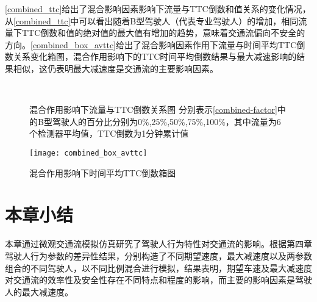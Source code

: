 \autoref{combined_ttc}给出了混合影响因素影响下流量与TTC倒数和值关系的变化情况，从\autoref{combined_ttc}中可以看出随着B型驾驶人（代表专业驾驶人）的增加，相同流量下TTC倒数和值的绝对值的最大值有增加的趋势，意味着交通流偏向不安全的方向。\autoref{combined_box_avttc}给出了混合影响因素作用下流量与时间平均TTC倒数关系变化箱图，混合作用影响下的TTC时间平均倒数结果与最大减速影响的结果相似，这仍表明最大减速度是交通流的主要影响因素。
\begin{figure}[htb]%
\centering
{}%
\\%
%
\caption[A set of four sub-floats.]{混合作用影响下流量与TTC倒数关系图
分别表示\autoref{combined-factor}中的B型驾驶人的百分比分别为0\%,25\%,50\%,75\%,100\%，其中流量为6个检测器平均值，TTC倒数为1分钟累计值}%
\label{combined_ttc}%
\end{figure}

\begin{figure}[htb]
\begin{center}
\texttt{[image: combined\_box\_avttc]}
\caption{混合作用影响下时间平均TTC倒数箱图}
\label{combined_box_avttc}
\end{center}
\end{figure}

\FloatBarrier

\section{本章小结}
本章通过微观交通流模拟仿真研究了驾驶人行为特性对交通流的影响。根据第四章驾驶人行为参数的差异性结果，分别构造了不同期望速度，最大减速度以及两参数组合的不同驾驶人，以不同比例混合进行模拟，结果表明，期望车速及最大减速度对交通流的效率性及安全性存在不同特点和程度的影响，而主要的影响因素是驾驶人的最大减速度。

